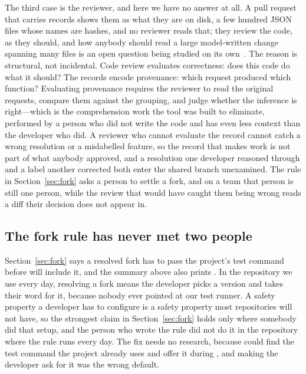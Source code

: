 The third case is the reviewer, and here we have no answer at all. A pull request that
carries \sgt{} records shows them as what they are on disk, a few hundred JSON files
whose names are hashes, and no reviewer reads that; they review the code, as they
should, and how anybody should read a large model-written change spanning many files is
an open question being studied on its own~\cite{heander2026}. The reason is structural,
not incidental. Code review evaluates correctness: does this code do what it should?
The \sgt{} records encode provenance: which request produced which function? Evaluating
provenance requires the reviewer to read the original requests, compare them against the
grouping, and judge whether the inference is right---which is the comprehension work
the tool was built to eliminate, performed by a person who did not write the code and
has even less context than the developer who did. A reviewer who cannot evaluate the
record cannot catch a wrong resolution or a mislabelled feature, so the record that
makes  work is not part of what anybody approved, and a resolution one
developer reasoned through and a label another corrected both enter the shared branch
unexamined. The rule in Section~\ref{sec:fork} asks a person to settle a fork, and on
a team that person is still one person, while the review that would have caught them
being wrong reads a diff their decision does not appear in.

\subsection{The fork rule has never met two people}
\label{sec:forkoff}

Section~\ref{sec:fork} says a resolved fork has to pass the project's test command
before \sgt{} will include it, and the summary above also prints
. In the repository we use every day, resolving a fork
means the developer picks a version and \sgt{} takes their word for it, because
nobody ever pointed \sgt{} at our test runner. A safety property a developer has to
configure is a safety property most repositories will not have, so the strongest
claim in Section~\ref{sec:fork} holds only where somebody did that setup, and the
person who wrote the rule did not do it in the repository where the rule runs every
day. The fix needs no research, because \sgt{} could find the test command the
project already uses and offer it during , and making the developer
ask for it was the wrong default.

